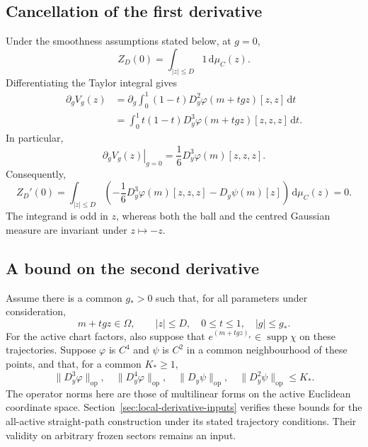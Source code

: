 \documentclass[10pt,reqno]{amsart}
\theoremstyle{definition}
\theoremstyle{remark}
\numberwithin{equation}{section}
\numberwithin{figure}{section}
\newcommand{\dd}{\mathrm d}
\begin{document}
\subsection{Cancellation of the first derivative}
Under the smoothness assumptions stated below, at $g=0$,
\begin{equation}\label{eq:central-zero-mass}
Z_D(0)=\int_{|z|\le D}1\,\dd\mu_C(z).
\end{equation}
Differentiating the Taylor integral gives
\begin{equation}\label{eq:first-taylor-g-derivative}
\begin{aligned}
\partial_gV_g(z)
&=\partial_g\int_0^1(1-t)D_y^2\varphi(m+tgz)[z,z]\,\dd t\\
&=\int_0^1t(1-t)D_y^3\varphi(m+tgz)[z,z,z]\,\dd t.
\end{aligned}
\end{equation}
In particular,
\begin{equation}\label{eq:first-taylor-at-zero}
\left.\partial_gV_g(z)\right|_{g=0}
=\frac16D_y^3\varphi(m)[z,z,z].
\end{equation}
Consequently,
\begin{equation}\label{eq:central-first-derivative}
Z_D'(0)=\int_{|z|\le D}
\left(-\frac16D_y^3\varphi(m)[z,z,z]-D_y\psi(m)[z]\right)\,\dd\mu_C(z)=0.
\end{equation}
The integrand is odd in $z$, whereas both the ball and the centred Gaussian
measure are invariant under $z\mapsto-z$.

\subsection{A bound on the second derivative}
Assume there is a common $g_*>0$ such that, for all parameters under
consideration,
\begin{equation}\label{eq:common-central-neighbourhood}
m+tgz\in\Omega,
\qquad |z|\le D,\quad 0\le t\le1,\quad |g|\le g_*.
\end{equation}
For the active chart factors, also suppose that
$e^{(m+tgz)_e}\in\operatorname{supp}\chi$ on these trajectories.
Suppose $\varphi$ is $C^4$ and $\psi$ is $C^2$ in a common neighbourhood
of these points, and that, for a common $K_*\ge1$,
\begin{equation}\label{eq:central-derivative-inputs}
\|D_y^3\varphi\|_{\mathrm{op}},\quad
\|D_y^4\varphi\|_{\mathrm{op}},\quad
\|D_y\psi\|_{\mathrm{op}},\quad
\|D_y^2\psi\|_{\mathrm{op}}\le K_*.
\end{equation}
The operator norms here are those of multilinear forms on the active
Euclidean coordinate space. Section~\ref{sec:local-derivative-inputs} verifies these bounds for the
all-active straight-path construction under its stated trajectory
conditions. Their validity on arbitrary frozen sectors remains an input.
\end{document}
